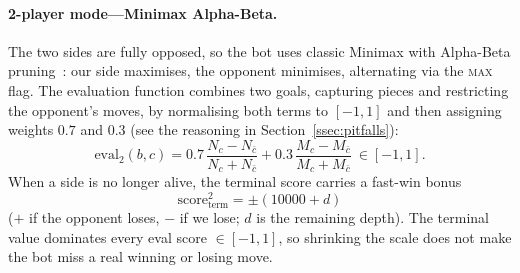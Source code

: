 \paragraph{2-player mode---Minimax Alpha-Beta.} The two sides are fully
opposed, so the bot uses classic Minimax with Alpha-Beta
pruning~\citep{knuth1975alphabeta}: our side maximises, the opponent minimises,
alternating via the \textsc{max} flag. The evaluation function combines two
goals, capturing pieces and restricting the opponent's moves, by normalising both terms to
$[-1,1]$ and then assigning weights $0.7$ and $0.3$ (see the reasoning in
Section~\ref{ssec:pitfalls}):
\begin{equation}
\mathrm{eval}_2(b,c)=0.7\,\frac{N_c-N_{\bar c}}{N_c+N_{\bar c}}
+0.3\,\frac{M_c-M_{\bar c}}{M_c+M_{\bar c}}\ \in[-1,1].
\label{eq:eval}
\end{equation}
When a side is no longer alive, the terminal score carries a fast-win bonus
\begin{equation}
\mathrm{score}^{2}_{\text{term}}=\pm(10000+d)
\label{eq:term2}
\end{equation}
($+$ if the opponent loses, $-$ if we lose; $d$ is the remaining depth).
The terminal value dominates every eval score $\in[-1,1]$, so shrinking the
scale does not make the bot miss a real winning or losing move.

